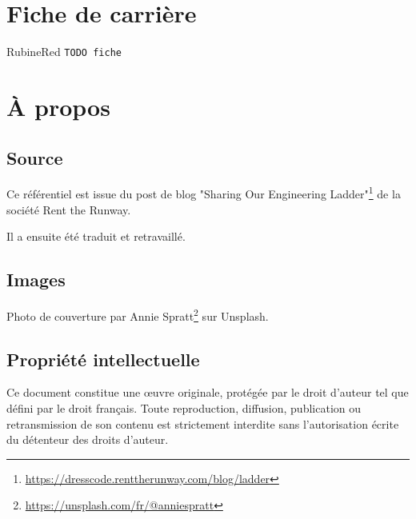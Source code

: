 \documentclass[a4paper, french, openany, 12pt]{book}
\newcommand{\todo}[1]{
  \begin{color}{RubineRed}
    \texttt{TODO {#1}}
  \end{color}
}
\begin{document}
\backmatter

\chapter*{Fiche de carrière}

\todo{fiche}

\chapter*{À propos}

\begin{multicols}{2}
  \section*{Source}

  Ce référentiel est issue du post de blog
  "Sharing Our Engineering Ladder"\footnote{\url{https://dresscode.renttherunway.com/blog/ladder}}
  de la société Rent the Runway.

  Il a ensuite été traduit et retravaillé.

  \section*{Images}

  Photo de couverture par Annie Spratt\footnote{\url{https://unsplash.com/fr/@anniespratt}} sur Unsplash.

  \section*{Propriété intellectuelle}

  Ce document constitue une \oe uvre originale, protégée par le droit d'auteur tel que défini par le droit français.
  Toute reproduction, diffusion, publication ou retransmission de son contenu est strictement interdite sans
  l'autorisation écrite du détenteur des droits d'auteur.
\end{multicols}

\tableofcontents
\end{document}

